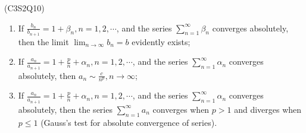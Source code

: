 \begin{prb}
    (C3S2Q10)
    \begin{enumerate}
        \item[a)] If $\frac{b_n}{b_{n+1}} = 1 + \beta_n, n = 1, 2, \cdots$, and the series $\sum_{n=1}^\infty \beta_n$ converges absolutely, then the limit $\lim_{n \to \infty} b_n = b$ evidently exists;
        \item[b)] If $\frac{a_n}{a_{n+1}} = 1 + \frac{p}{n} + \alpha_n, n = 1, 2, \cdots$, and the series $\sum_{n=1}^\infty \alpha_n$ converges absolutely, then $a_n \sim \frac{c}{n^p}, n \to \infty$;
        \item[c)] If $\frac{a_n}{a_{n+1}} = 1 + \frac{p}{n} + \alpha_n, n = 1, 2, \cdots$, and the series $\sum_{n=1}^\infty \alpha_n$ converges absolutely, then the series $\sum_{n=1}^\infty a_n$ converges when $p > 1$ and diverges 
        when $p \leq 1$ (Gauss's test for absolute convergence of series).
    \end{enumerate}
\end{prb}

